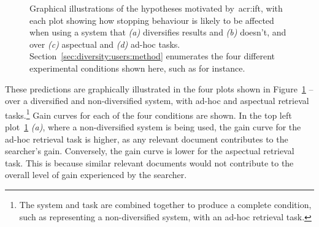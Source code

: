 \begin{figure}[t!]
    \centering
    \caption[\gls{acr:ift} and diversification: hypothesis illustrations]{Graphical illustrations of the hypotheses motivated by~\gls{acr:ift}, with each plot showing how stopping behaviour is likely to be affected when using a system that \emph{(a)} diversifies results and \emph{(b)} doesn't, and over \emph{(c)} aspectual and \emph{(d)} ad-hoc tasks. Section~\ref{sec:diversity:users:method} enumerates the four different experimental conditions shown here, such as  for instance.}
    \label{fig:ift_theory}
\end{figure}

These predictions are graphically illustrated in the four plots shown in Figure~\ref{fig:ift_theory} -- over a diversified  and non-diversified  system, with ad-hoc  and aspectual  retrieval tasks.\footnote{The system and task are combined together to produce a complete condition, such as  representing a non-diversified system, with an ad-hoc retrieval task.} Gain curves for each of the four conditions are shown. In the top left plot~\ref{fig:ift_theory} \emph{(a)}, where a non-diversified system is being used, the gain curve for the ad-hoc retrieval task is higher, as any relevant document contributes to the searcher's gain. Conversely, the gain curve is lower for the aspectual retrieval task. This is because similar relevant documents would not contribute to the overall level of gain experienced by the searcher.

